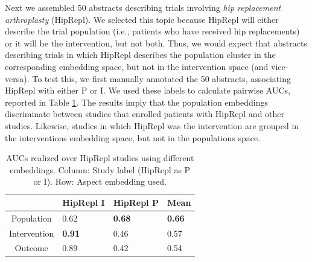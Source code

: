 \documentclass[11pt,a4paper]{article}
\begin{document}
Next we assembled 50 abstracts describing trials involving \emph{hip replacement arthroplasty} (HipRepl). We selected this topic because HipRepl will either describe the trial population (i.e., patients who have received hip replacements) or it will be the intervention, but not both. Thus, we would expect that abstracts describing trials in which HipRepl describes the population cluster in the corresponding embedding space, but not in the intervention space (and vice-versa). To test this, we first manually annotated the 50 abstracts, associating HipRepl with either P or I. We used these labels to calculate pairwise AUCs, reported in Table \ref{table:pubmed-AUCS}. The results imply that the population embeddings discriminate between studies that enrolled patients with HipRepl and other studies. Likewise, studies in which HipRepl was the intervention are grouped in the interventions embedding space, but not in the populations space. 

\begin{table}
\small
\begin{tabularx}{\columnwidth}{c|X X X}
\hline
& HipRepl I & HipRepl P & Mean \\ \hline
Population & 0.62 & \textbf{0.68} & \textbf{0.66} \\ 
Intervention & \textbf{0.91} & 0.46 & 0.57 \\ 
Outcome & 0.89 & 0.42 & 0.54 \\ 
\end{tabularx}
\vspace{-.65em}
\caption{AUCs realized over HipRepl studies using different embeddings. Column: Study label (HipRepl as P or I). Row: Aspect embedding used.}
\label{table:pubmed-AUCS}
\vspace{-.75em}
\end{table}
\end{document}
